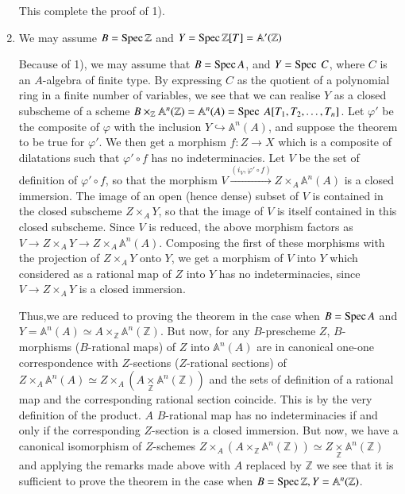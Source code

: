 \begin{enumerate}
This complete the proof of 1).

\item We may assume $B = \operatorname{Spec} \mathbb{Z}$ and $Y = \operatorname{Spec} \mathbb{Z}[T] =
\mathbb{A}' (\mathbb{Z})$ 

Because of 1), we may assume that $B = \operatorname{Spec} A$, and $Y = \operatorname{Spec} ~ C$,
where $C$ is an $A$-algebra of finite type. By expressing $C$ as the
quotient of a polynomial ring in a finite number of variables, we see
that we can realise $Y$ as a closed subscheme of a scheme $B
\times_{\mathbb{Z}} \mathbb{A}^{n} (\mathbb{Z})= \mathbb{A}^{n} (A) = \operatorname{Spec}
~ A [T_{1}, T_{2}, \ldots , T_{n}]$. Let $\varphi'$ be the composite
of $\varphi$ with the inclusion $Y \hookrightarrow \mathbb{A}^{n}(A)$,
and suppose the theorem to be true for $\varphi'$. We then get a
morphism $f:Z \to X$ which is a composite of dilatations such that
$\varphi '\circ f$ has no indeterminacies. Let $V$ be the set of
definition of $\varphi' \circ f$, so that the morphism $V
\xrightarrow{(i_{V}, \varphi' \circ f)} Z \times_A \mathbb{A}^{n}(A)$ is
a closed immersion. The image of an open (hence dense) subset of $V$
is contained in the closed subscheme $Z \times_A Y$, so that the image of
$V$ is itself contained in this closed subscheme. Since $V$  is
reduced, the above morphism factors as $V \to Z \times_A Y \to Z \times_A
\mathbb{A}^{n}(A)$. Composing the first of these morphisms with the
projection of $Z \times_A Y$ onto $Y$, we get a morphism of $V$ into $Y$
which considered as a rational map of $Z$ into $Y$ has no
indeterminacies, since $V \to Z \times_A Y$ is a closed immersion. 

Thus,\pageoriginale we are reduced to proving the theorem in the case
when $B = 
\operatorname{Spec} A$ and $Y = \mathbb{A}^{n} (A) \simeq A
\times_{\mathbb{Z}}\mathbb{A}^{n} (\mathbb{Z})$. But now, for any
$B$-prescheme $Z$, $B$- morphisms (\resp $B$-rational maps) of $Z$ into
$\mathbb{A}^{n}(A)$ are in canonical one-one correspondence with
$Z$-sections (\resp $Z$-rational sections) of $Z \times_A \mathbb{A}^{n}(A)
\simeq Z \times_A  (A \underset{\mathbb{Z}}{\times} \mathbb{A}^{n}
(\mathbb{Z}))$ and the sets of definition of a rational map and the
corresponding rational section coincide. This is by the very
definition of the product. $A$ $B$-rational map has no indeterminacies
if and only if the corresponding $Z$-section is a closed immersion. But
now, we have a canonical isomorphism of $Z$-schemes $Z \times_{A} (A
\times_{\mathbb{Z}} \mathbb{A}^{n}(\mathbb{Z})) \simeq Z
\underset{\mathbb{Z}}{\times} \mathbb{A}^{n} (\mathbb{Z})$ and
applying the remarks made above with $A$ replaced
by $\mathbb{Z}$ we see that it is sufficient to prove the theorem in
the case when $B =\operatorname{Spec} \mathbb{Z}, Y = \mathbb{A}^{n} (\mathbb{Z})$. 


\end{enumerate}

